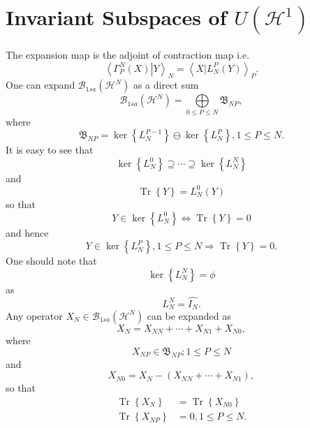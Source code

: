 \documentclass[aps,preprint]{revtex4}%
\begin{document}
\section{Invariant Subspaces of $U\left(  \mathcal{H}^{1}\right)  $}

The expansion map is the adjoint of contraction map i.e.
\begin{equation}
\left\langle \left.  \Gamma_{P}^{N}\left(  X\right)  \right\vert
Y\right\rangle _{N}=\left\langle \left.  X\right\vert L_{N}^{P}\left(
Y\right)  \right\rangle _{P}.
\end{equation}
One can expand $\mathcal{B}_{1sa}\left(  \mathcal{H}^{N}\right)  $ as a direct
sum
\begin{equation}
\mathcal{B}_{1sa}\left(  \mathcal{H}^{N}\right)  =%
{\displaystyle\bigoplus\limits_{0\leq P\leq N}}
\mathfrak{B}_{NP},
\end{equation}
where
\begin{equation}
\mathfrak{B}_{NP}=\ker\left\{  L_{N}^{P-1}\right\}  \ominus\ker\left\{
L_{N}^{P}\right\}  ,1\leq P\leq N.
\end{equation}
It is easy to see that%
\begin{equation}
\ker\left\{  L_{N}^{0}\right\}  \supseteq\cdots\supseteq\ker\left\{  L_{N}%
^{N}\right\}
\end{equation}
and%
\begin{equation}
\operatorname*{Tr}\left\{  Y\right\}  =L_{N}^{0}\left(  Y\right)
\end{equation}
so that
\begin{equation}
Y\in\ker\left\{  L_{N}^{0}\right\}  \Leftrightarrow\operatorname*{Tr}\left\{
Y\right\}  =0
\end{equation}
and hence
\begin{equation}
Y\in\ker\left\{  L_{N}^{P}\right\}  ,1\leq P\leq N\Rightarrow
\operatorname*{Tr}\left\{  Y\right\}  =0.
\end{equation}
One should note that
\begin{equation}
\ker\left\{  L_{N}^{N}\right\}  =\phi
\end{equation}
as
\begin{equation}
L_{N}^{N}=\widehat{I_{N}}.
\end{equation}
Any operator $X_{N}\in\mathcal{B}_{1sa}\left(  \mathcal{H}^{N}\right)  $ can
be expanded as
\begin{equation}
X_{N}=X_{NN}+\cdots+X_{N1}+X_{N0},
\end{equation}
where
\begin{equation}
X_{NP}\in\mathfrak{B}_{NP};1\leq P\leq N
\end{equation}
and
\begin{equation}
X_{N0}=X_{N}-\left(  X_{NN}+\cdots+X_{N1}\right)  ,
\end{equation}
so that
\begin{align}
\operatorname*{Tr}\left\{  X_{N}\right\}   &  =\operatorname*{Tr}\left\{
X_{N0}\right\} \nonumber\\
\operatorname*{Tr}\left\{  X_{NP}\right\}   &  =0,1\leq P\leq N.
\end{align}
\end{document}
